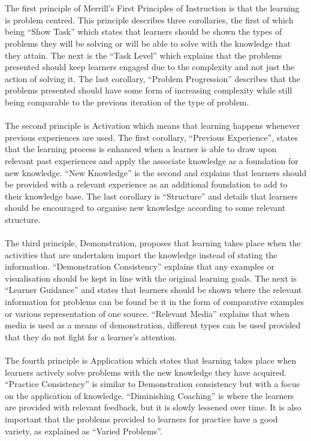 \documentclass[conference]{IEEEtran}
\begin{document}
\\\\
The first principle of Merrill’s First Principles of Instruction is that the learning is problem centred. This principle describes three corollaries, the first of which being “Show Task” which states that learners should be shown the types of problems they will be solving or will be able to solve with the knowledge that they attain\cite{Merrill2002}. The next is the “Task Level” which explains that the problems presented should keep learners engaged due to the complexity and not just the action of solving it\cite{Merrill2002}. The last corollary, “Problem Progression” describes that the problems presented should have some form of increasing complexity while still being comparable to the previous iteration of the type of problem\cite{Merrill2002}.
\\\\
The second principle is Activation which means that learning happens whenever previous experiences are used\cite{Merrill2002}. The first corollary, “Previous Experience”, states that the learning process is enhanced when a learner is able to draw upon relevant past experiences and apply the associate knowledge as a foundation for new knowledge\cite{Merrill2002}. “New Knowledge” is the second and explains that learners should be provided with a relevant experience as an additional foundation to add to their knowledge base\cite{Merrill2002}. The last corollary is “Structure” and details that learners should be encouraged to organise new knowledge according to some relevant structure\cite{Merrill2002}.
\\\\
The third principle, Demonstration, proposes that learning takes place when the activities that are undertaken impart the knowledge instead of stating the information\cite{Merrill2002}. “Demonstration Consistency” explains that any examples or visualisation should be kept in line with the original learning goals\cite{Merrill2002}. The next is “Learner Guidance” and states that learners should be shown where the relevant information for problems can be found be it in the form of comparative examples or various representation of one source\cite{Merrill2002}. “Relevant Media” explains that when media is used as a means of demonstration, different types can be used provided that they do not fight for a learner’s attention\cite{Merrill2002}.
\\\\
The fourth principle is Application which states that learning takes place when learners actively solve problems with the new knowledge they have acquired\cite{Merrill2002}. “Practice Consistency” is similar to Demonstration consistency but with a focus on the application of knowledge\cite{Merrill2002}. “Diminishing Coaching” is where the learners are provided with relevant feedback, but it is slowly lessened over time\cite{Merrill2002}. It is also important that the problems provided to learners for practice have a good variety, as explained as “Varied Problems”\cite{Merrill2002}.
\end{document}
